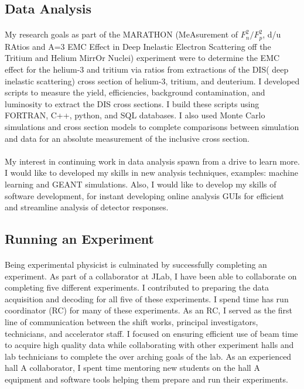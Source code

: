 \documentclass[12pt,letterpaper]{article}
\begin{document}
\subsection*{Data Analysis}
\paragraph{}My research goals as part of the MARATHON (MeAsurement of $F_n^2/F_p^2$, d/u RAtios and A=3 EMC Effect in Deep Inelastic Electron Scattering off the Tritium and Helium MirrOr Nuclei) experiment were to determine the EMC effect for the helium-3 and tritium via ratios from extractions of the DIS( deep inelastic scattering) cross section of helium-3, tritium, and deuterium. I developed scripts to measure the yield, efficiencies, background contamination, and luminosity to extract the DIS cross sections. I build these scripts using FORTRAN, C++, python, and SQL databases. I also used Monte Carlo simulations and cross section models to complete comparisons between simulation and data for an absolute measurement of the inclusive cross section. 
 \vspace{-2em}
\paragraph{}My interest in continuing work in data analysis spawn from a drive to learn more. I would like to developed my skills in new analysis techniques, examples: machine learning and GEANT simulations. Also, I would like to develop my skills of software development, for instant developing online analysis GUIs for efficient and streamline analysis of detector responses. 
 \vspace{-1em}
\subsection*{Running an Experiment}
\paragraph{}Being experimental physicist is culminated by successfully completing an experiment. As part of a collaborator at JLab, I have been able to collaborate on completing five different experiments. I contributed to preparing the data acquisition and decoding for all five of these experiments. I spend time has run coordinator (RC) for many of these experiments. As an RC, I served as the first line of communication between the shift works, principal investigators, technicians, and accelerator staff. I focused on ensuring efficient use of beam time to acquire high quality data while collaborating with other experiment halls and lab technicians to complete the over arching goals of the lab. As an experienced hall A collaborator, I spent time mentoring new students on the hall A equipment and software tools helping them prepare and run their experiments.
\vspace{-1em}
\end{document}

